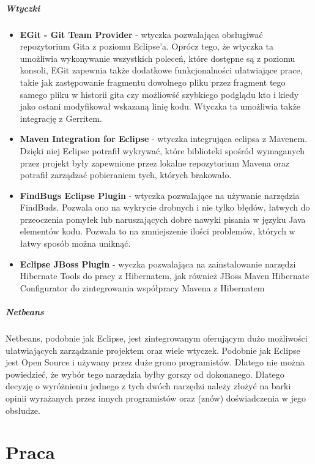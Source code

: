 \documentclass[licencjacka]{pracamgr}
\begin{document}
\paragraph{Wtyczki}
\begin{itemize}
\item \textbf{EGit - Git Team Provider} - wtyczka pozwalająca obsługiwać repozytorium Gita z poziomu Eclipse'a. Oprócz tego, że wtyczka ta umożliwia wykonywanie wszystkich poleceń, które dostępne są z poziomu konsoli, EGit zapewnia także dodatkowe funkcjonalności ułatwiające prace, takie jak zastępowanie fragmentu dowolnego pliku przez fragment tego samego pliku w historii gita czy możliowść szybkiego podglądu kto i kiedy jako ostani modyfikował wskazaną linię kodu. Wtyczka ta umożliwia także integrację z Gerritem.
\item \textbf{Maven Integration for Eclipse} - wtyczka integrująca eclipsa z Mavenem. Dzięki niej Eclipse potrafił wykrywać, które biblioteki spośród wymaganych przez projekt były zapewnione przez lokalne repozytorium Mavena oraz potrafił zarządzać pobieraniem tych, których brakowało.
\item \textbf{FindBugs Eclipse Plugin} - wtyczka pozwalające na używanie narzędzia FindBuds. Pozwala ono na wykrycie drobnych i nie tylko błędów, łatwych do przeoczenia pomyłek lub naruszających dobre nawyki pisania w języku Java elementów kodu. Pozwala to na zmniejszenie ilości problemów, których w łatwy sposób można uniknąć.
\item \textbf{Eclipse JBoss Plugin} - wyczka pozwalająca na zainstalowanie narzędzi Hibernate Tools do pracy z Hibernatem, jak również JBoss Maven Hibernate Configurator do zintegrowania współpracy Mavena z Hibernatem
\end{itemize}

\paragraph{Netbeans}
Netbeans, podobnie jak Eclipse, jest zintegrowanym oferującym dużo możliwości ułatwiających zarządzanie projektem oraz wiele wtyczek. Podobnie jak Eclipse jest Open Source i używany przez duże grono programistów. Dlatego nie można powiedzieć, że wybór tego narzędzia byłby gorszy od dokonanego. Dlatego decyzję o wyróżnieniu jednego z tych dwóch narzędzi należy złożyć na barki opinii wyrażanych przez innych programistów oraz (znów) doświadczenia w jego obsłudze.


\chapter{Praca}
\end{document}

